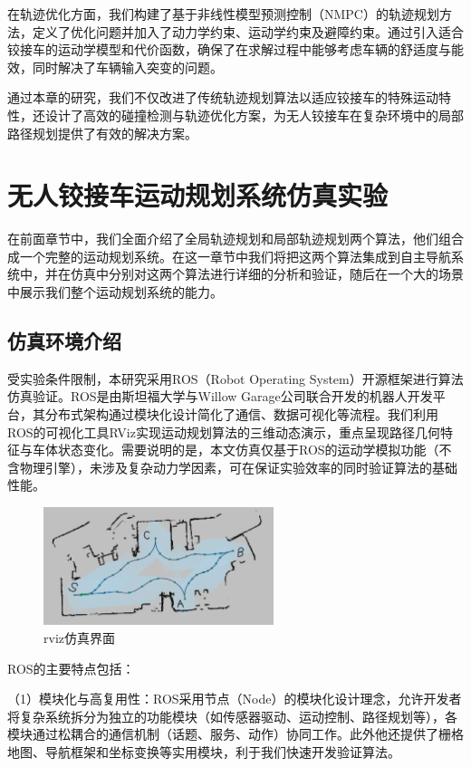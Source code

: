 \documentclass[master,academic]{ysuthesis} %
\begin{document}
	在轨迹优化方面，我们构建了基于非线性模型预测控制（NMPC）的轨迹规划方法，定义了优化问题并加入了动力学约束、运动学约束及避障约束。通过引入适合铰接车的运动学模型和代价函数，确保了在求解过程中能够考虑车辆的舒适度与能效，同时解决了车辆输入突变的问题。

	通过本章的研究，我们不仅改进了传统轨迹规划算法以适应铰接车的特殊运动特性，还设计了高效的碰撞检测与轨迹优化方案，为无人铰接车在复杂环境中的局部路径规划提供了有效的解决方案。
	
	\chapter{无人铰接车运动规划系统仿真实验}
	在前面章节中，我们全面介绍了全局轨迹规划和局部轨迹规划两个算法，他们组合成一个完整的运动规划系统。在这一章节中我们将把这两个算法集成到自主导航系统中，并在仿真中分别对这两个算法进行详细的分析和验证，随后在一个大的场景中展示我们整个运动规划系统的能力。
	\section{仿真环境介绍}
	受实验条件限制，本研究采用ROS（Robot Operating System）开源框架进行算法仿真验证。ROS是由斯坦福大学与Willow Garage公司联合开发的机器人开发平台，其分布式架构通过模块化设计简化了通信、数据可视化等流程。我们利用ROS的可视化工具RViz实现运动规划算法的三维动态演示，重点呈现路径几何特征与车体状态变化。需要说明的是，本文仿真仅基于ROS的运动学模拟功能（不含物理引擎），未涉及复杂动力学因素，可在保证实验效率的同时验证算法的基础性能。
	\begin{figure}[!ht]
		\centering
		\includegraphics[width=0.6\textwidth]{多阶段轨迹s.png}
		\caption{rviz仿真界面}
		\label{fig:rviz仿真界面}
	\end{figure}

	ROS的主要特点包括：

	（1）模块化与高复用性：ROS采用节点（Node）的模块化设计理念，允许开发者将复杂系统拆分为独立的功能模块（如传感器驱动、运动控制、路径规划等），各模块通过松耦合的通信机制（话题、服务、动作）协同工作。此外他还提供了栅格地图、导航框架和坐标变换等实用模块，利于我们快速开发验证算法。
\end{document}
